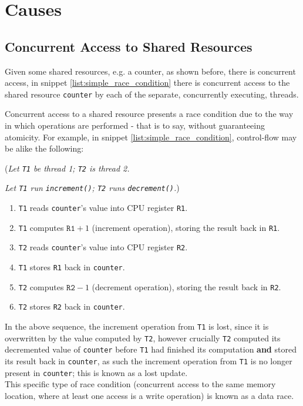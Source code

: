 \section{Causes}
\subsection{Concurrent Access to Shared Resources}
Given some shared resources, e.g. a counter, as shown before, there is concurrent access, in snippet \ref{list:simple_race_condition} there is concurrent access to the shared resource \texttt{counter} by each of the separate, concurrently executing, threads.

Concurrent access to a shared resource presents a race condition due to the way in which operations are performed - that is to say, without guaranteeing atomicity. For example, in snippet \ref{list:simple_race_condition}, control-flow may be alike the following:

(\textit{Let \texttt{T1} be thread 1; \texttt{T2} is thread 2.}

\textit{Let \texttt{T1} run \texttt{increment()}; \texttt{T2} runs \texttt{decrement()}.})
\begin{enumerate}
    \item \texttt{T1} reads \texttt{counter}'s value into CPU register \texttt{R1}.
    \item \texttt{T1} computes \(\texttt{R1}+1\) (increment operation), storing the result back in \texttt{R1}.
    \item \texttt{T2} reads \texttt{counter}'s value into CPU register \texttt{R2}.
    \item \texttt{T1} stores \texttt{R1} back in \texttt{counter}.
    \item \texttt{T2} computes \(\texttt{R2}-1\) (decrement operation), storing the result back in \texttt{R2}.
    \item \texttt{T2} stores \texttt{R2} back in \texttt{counter}.
\end{enumerate}
In the above sequence, the increment operation from \texttt{T1} is lost, since it is overwritten by the value computed by \texttt{T2}, however crucially \texttt{T2} computed its decremented value of \texttt{counter} before \texttt{T1} had finished its computation \textbf{and} stored its result back in \texttt{counter}, as such the increment operation from \texttt{T1} is no longer present in \texttt{counter}; this is known as a lost update.\\
This specific type of race condition (concurrent access to the same memory location, where at least one access is a write operation) is known as a data race.

